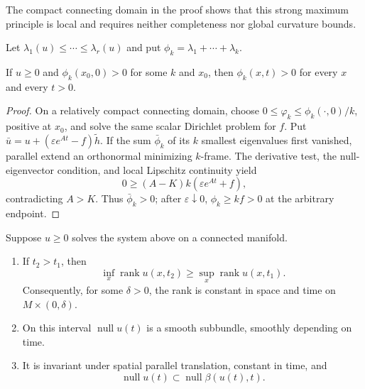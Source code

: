 \begin{remark}
\label{rem:system-strong-maximum-principle-locality}
The compact connecting domain in the proof shows that this strong maximum
principle is local and requires neither completeness nor global curvature
bounds.
\end{remark}

Let $\lambda_1(u)\leq\cdots\leq\lambda_r(u)$ and put
$\phi_k=\lambda_1+\cdots+\lambda_k$.

\begin{proposition}
\label{prop:system-strong-maximum-principle-eigenvalue-sums}
If $u\geq0$ and $\phi_k(x_0,0)>0$ for some $k$ and $x_0$, then
$\phi_k(x,t)>0$ for every $x$ and every $t>0$.
\end{proposition}

\begin{proof}
\sketch
{}
On a relatively compact connecting domain, choose
$0\leq\varphi_k\leq\phi_k(\cdot,0)/k$, positive at $x_0$, and solve the same
scalar Dirichlet problem for $f$.  Put
$\bar u=u+(\varepsilon e^{At}-f)\widetilde h$.  If the sum $\bar\phi_k$ of
its $k$ smallest eigenvalues first vanished, parallel extend an orthonormal
minimizing $k$-frame.  The derivative test, the null-eigenvector condition,
and local Lipschitz continuity yield
\[
0\geq (A-K)k(\varepsilon e^{At}+f),
\]
contradicting $A>K$.  Thus $\bar\phi_k>0$; after
$\varepsilon\downarrow0$, $\phi_k\geq kf>0$ at the arbitrary endpoint.
\end{proof}

\begin{theorem}
\label{thm:system-null-space-rigidity}
Suppose $u\geq0$ solves the system above on a connected manifold.
\begin{enumerate}
\item If $t_2>t_1$, then
\[
\inf_x\operatorname{rank}u(x,t_2)
\geq\sup_x\operatorname{rank}u(x,t_1).
\]
Consequently, for some $\delta>0$, the rank is constant in space and time on
$M\times(0,\delta)$.
\item On this interval $\operatorname{null}u(t)$ is a smooth subbundle,
smoothly depending on time.
\item It is invariant under spatial parallel translation, constant in time,
and
\[
\operatorname{null}u(t)\subset
\operatorname{null}\beta(u(t),t).
\]
\end{enumerate}
\end{theorem}

